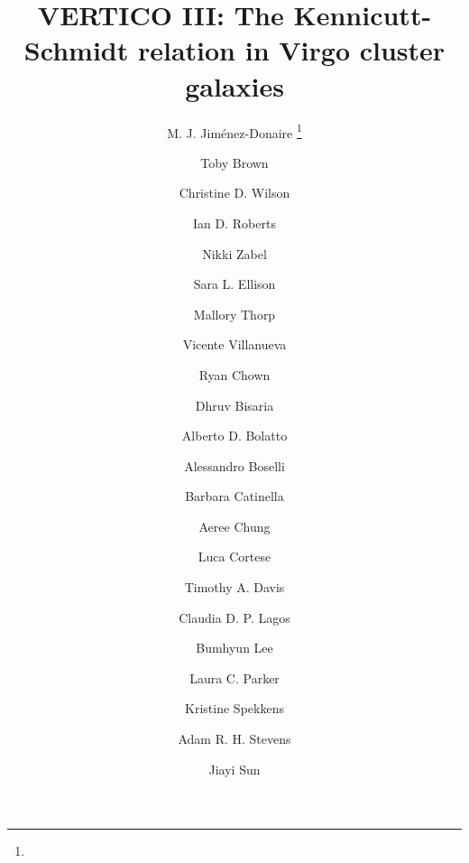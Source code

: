 \documentclass[longauth]{aa}
\begin{document}
 


   \title{VERTICO III: The Kennicutt-Schmidt relation in Virgo cluster galaxies}

   \author{M. J. Jim\'enez-Donaire
          \inst{\ref{oan},\ref{yebes}} \fnmsep\thanks{}
          \and
          Toby Brown \inst{\ref{herzberg}}
          \and
          Christine D. Wilson \inst{\ref{mcmaster}}
          \and
          Ian D. Roberts \inst{\ref{leiden}}
          \and
          Nikki Zabel \inst{\ref{uct}}
          \and
          Sara L. Ellison \inst{\ref{victoria}}
          \and
          Mallory Thorp \inst{\ref{victoria}}
          \and
          Vicente Villanueva \inst{\ref{maryland}}
          \and
          Ryan Chown \inst{\ref{uwo},\ref{space}}          
          \and
          Dhruv Bisaria \inst{\ref{queens}}          
          \and
          Alberto D. Bolatto \inst{\ref{maryland}}          
          \and
          Alessandro Boselli \inst{\ref{marseille}}
          \and
          Barbara Catinella \inst{\ref{uwa},\ref{astro3d}}
          \and
          Aeree Chung \inst{\ref{yonsei}}
          \and
          Luca Cortese \inst{\ref{uwa},\ref{astro3d}}          
          \and
          Timothy A. Davis \inst{\ref{cardiff}}
          \and          
          Claudia D. P. Lagos \inst{\ref{uwa},\ref{astro3d}}
          \and
          Bumhyun Lee \inst{\ref{kasi}}
          \and
          Laura C. Parker \inst{\ref{mcmaster}}          
          \and
          Kristine Spekkens \inst{\ref{royal}}
          \and
          Adam R. H. Stevens \inst{\ref{uwa}}          
          \and
          Jiayi Sun \inst{\ref{mcmaster},\ref{cita}}
          }
\end{document}
